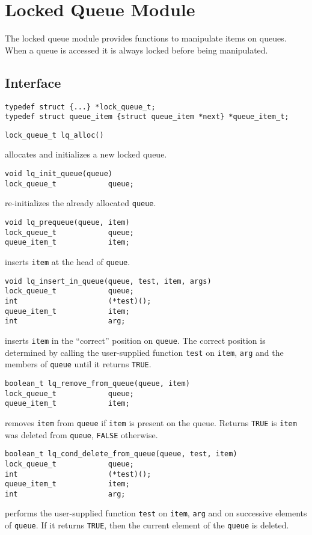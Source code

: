 \section{Locked Queue Module}
The locked queue module provides functions to manipulate items on queues.
When a queue is accessed it is always locked before being manipulated.

\subsection{Interface}
\begin{verbatim}
typedef struct {...} *lock_queue_t;
typedef struct queue_item {struct queue_item *next} *queue_item_t;
\end{verbatim}

\begin{verbatim}
lock_queue_t lq_alloc()
\end{verbatim}
allocates and initializes a new locked queue.

\begin{verbatim}
void lq_init_queue(queue)
lock_queue_t            queue;
\end{verbatim}
re-initializes the already allocated \verb"queue".

\begin{verbatim}
void lq_prequeue(queue, item)
lock_queue_t            queue;
queue_item_t            item;
\end{verbatim}	
inserts \verb"item" at the head of \verb"queue".

\begin{verbatim}
void lq_insert_in_queue(queue, test, item, args)
lock_queue_t            queue;
int                     (*test)();
queue_item_t            item;
int                     arg;
\end{verbatim}
inserts \verb"item" in the ``correct'' position on \verb"queue".  The
correct position is determined by calling the user-supplied function
\verb"test" on \verb"item", \verb"arg" and the members of \verb"queue"
until it returns \verb"TRUE".

\begin{verbatim}
boolean_t lq_remove_from_queue(queue, item)
lock_queue_t            queue;
queue_item_t            item;
\end{verbatim}
removes \verb"item" from \verb"queue" if \verb"item" is
present on the queue.  Returns \verb"TRUE" is \verb"item" was deleted from 
\verb"queue", \verb"FALSE" otherwise.

\begin{verbatim}
boolean_t lq_cond_delete_from_queue(queue, test, item)
lock_queue_t            queue;
int                     (*test)();
queue_item_t            item;
int                     arg;
\end{verbatim}
performs the user-supplied function \verb"test" on \verb"item", \verb"arg"
and on successive elements of \verb"queue".  If it returns \verb"TRUE", then
the current element of the \verb"queue" is deleted.

